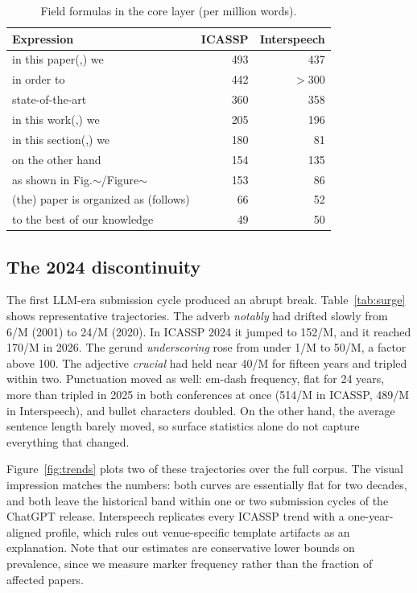 \documentclass[a4paper,10pt,twocolumn]{article}
\begin{document}
\begin{table}[t]
\centering
\caption{Field formulas in the core layer (per million words).}
\label{tab:formulas}
\small
\setlength{\tabcolsep}{4.5pt}
\begin{tabular}{lrr}
\toprule
Expression & ICASSP & Interspeech \\
\midrule
in this paper(,) we & 493 & 437 \\
in order to & 442 & $>$300 \\
state-of-the-art & 360 & 358 \\
in this work(,) we & 205 & 196 \\
in this section(,) we & 180 & 81 \\
on the other hand & 154 & 135 \\
as shown in Fig.$\sim$/Figure$\sim$ & 153 & 86 \\
(the) paper is organized as (follows) & 66 & 52 \\
to the best of our knowledge & 49 & 50 \\
\bottomrule
\end{tabular}
\end{table}

\subsection{The 2024 discontinuity}

The first LLM-era submission cycle produced an abrupt break. Table~\ref{tab:surge} shows representative trajectories. The adverb \emph{notably} had drifted slowly from 6/M (2001) to 24/M (2020). In ICASSP 2024 it jumped to 152/M, and it reached 170/M in 2026. The gerund \emph{underscoring} rose from under 1/M to 50/M, a factor above 100. The adjective \emph{crucial} had held near 40/M for fifteen years and tripled within two. Punctuation moved as well: em-dash frequency, flat for 24 years, more than tripled in 2025 in both conferences at once (514/M in ICASSP, 489/M in Interspeech), and bullet characters doubled. On the other hand, the average sentence length barely moved, so surface statistics alone do not capture everything that changed.

Figure~\ref{fig:trends} plots two of these trajectories over the full corpus. The visual impression matches the numbers: both curves are essentially flat for two decades, and both leave the historical band within one or two submission cycles of the ChatGPT release. Interspeech replicates every ICASSP trend with a one-year-aligned profile, which rules out venue-specific template artifacts as an explanation. Note that our estimates are conservative lower bounds on prevalence, since we measure marker frequency rather than the fraction of affected papers.
\end{document}
